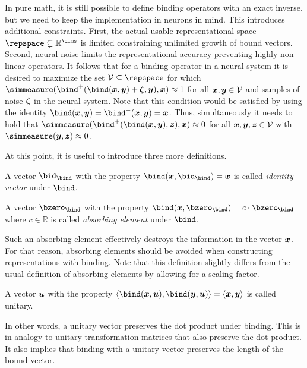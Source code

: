 In pure math, it is still possible to define binding operators with an exact inverse, but we need to keep the implementation in neurons in mind.
This introduces additional constraints.
First, the actual usable representational space $\repspace \subsetneq \mathbb{R}^{\dims}$ is limited constraining unlimited growth of bound vectors.
Second, neural noise limits the representational accuracy preventing highly non-linear operators.
It follows that for a binding operator in a neural system it is desired to maximize the set $\mathcal{V} \subseteq \repspace$ for which  $\simmeasure(\bind^+(\bind(\vc x, \vc y) + \vc\zeta, \vc y), \vc x) \approx 1$ for all $\bm{x}, \bm{y} \in \mathcal{V}$ and samples of noise $\bm{\zeta}$ in the neural system.
Note that this condition would be satisfied by using the identity $\bind(\vc x, \vc y) = \bind^+(\vc x, \vc y) = \vc x$.
Thus, simultaneously it needs to hold that $\simmeasure(\bind^+(\bind(\vc x, \vc y), \vc z), \vc x) \approx 0$ for all $\bm{x}, \bm{y}, \bm{z} \in \mathcal{V}$ with $\simmeasure(\vc y, \vc z) \approx 0$.

At this point, it is useful to introduce three more definitions.
\begin{defn}
    A vector $\bid_{\bind}$ with the property $\bind(\vc x, \bid_{\bind}) = \vc x$ is called \emph{identity vector} under $\bind$.
\end{defn}
\begin{defn}
    A vector $\bzero_{\bind}$ with the property $\bind(\vc x, \bzero_{\bind}) = c \cdot \bzero_{\bind}$ where $c \in \mathbb{R}$ is called \emph{absorbing element} under $\bind$.
\end{defn}
Such an absorbing element effectively destroys the information in the vector $\bm{x}$.
For that reason, absorbing elements should be avoided when constructing representations with binding.
Note that this definition slightly differs from the usual definition of absorbing elements by allowing for a scaling factor.
\begin{defn}
    A vector $\bm{u}$ with the property $\langle \bind(\vc x, \vc u), \bind(\vc y, \vc u) \rangle = \langle \vc x, \vc y \rangle$ is called unitary.
\end{defn}
In other words, a unitary vector preserves the dot product under binding.
This is in analogy to unitary transformation matrices that also preserve the dot product.
It also implies that binding with a unitary vector preserves the length of the bound vector.


